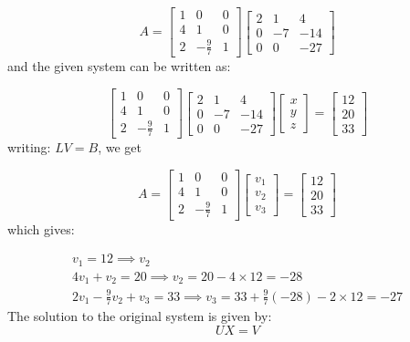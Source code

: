 \documentclass[a4paper, 12pt]{report}
\begin{document}
{\begin{equation*}
A=
\begin{bmatrix} 
1& 0& 0\\
4& 1& 0\\
2& -\frac{9}{7}& 1
\end{bmatrix}
\begin{bmatrix}
2& 1& 4\\
0& -7& -14\\
0& 0& -27
\end{bmatrix}
\end{equation*}
and the given system can be written as:

\begin{equation*}
\begin{bmatrix} 
1& 0& 0\\
4& 1& 0\\
2& -\frac{9}{7}& 1
\end{bmatrix}
\begin{bmatrix}
2& 1& 4\\
0& -7& -14\\
0& 0& -27
\end{bmatrix}
\begin{bmatrix}
x\\ y\\ z
\end{bmatrix}
=
\begin{bmatrix}
12\\ 20\\ 33
\end{bmatrix}
\end{equation*}
writing: $LV=B$, we get

\begin{equation*}
A=
\begin{bmatrix} 
1& 0& 0\\
4& 1& 0\\
2& -\frac{9}{7}& 1
\end{bmatrix}
\begin{bmatrix}
v_1\\ v_2\\ v_3
\end{bmatrix}
=
\begin{bmatrix}
12\\ 20\\ 33
\end{bmatrix}
\end{equation*}
which gives:

\begin{eqnarray*}
v_1=12 \implies \boxed{v_2}\\
4v_1+v_2=20\implies \boxed{v_2} = 20-4\times 12=-28\\
2v_1-\frac{9}{7}v_2+v_3=33\implies\boxed{v_3}=33+\frac{9}{7}(-28)-2\times 12=-27
\end{eqnarray*}
The solution to the original system is given by: $$UX =V$$

}
\end{document}
